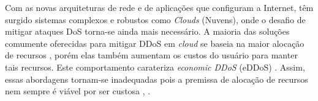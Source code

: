 Com as novas arquiteturas de rede e de aplicações que configuram a Internet, têm surgido sistemas complexos e robustos como \emph{Clouds} (Nuvens), onde o desafio de mitigar ataques DoS torna-se ainda mais necessário. A maioria das soluções comumente oferecidas para mitigar DDoS em \emph{cloud} se baseia na maior alocação de recursos \cite{Peng:2007:SND:1216370.1216373}, porém elas também aumentam os custos do usuário para manter tais recursos. Este comportamento carateriza \emph{economic DDoS} (eDDoS) \cite{Soon:10}.  
%
Assim, essas abordagens tornam-se inadequadas pois a premissa de alocação de recursos nem sempre é viável por ser custosa \cite{Bakshi:10}, \cite{Liu:2010:NFD:1866835.1866849}. %

